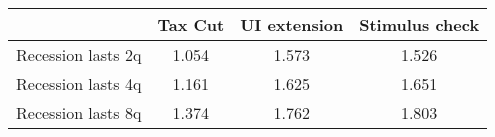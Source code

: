 \begin{tabular}{@{}lccc@{}} 
\toprule 
& Tax Cut    & UI extension    & Stimulus check    \\  \midrule 
Recession lasts 2q &1.054  & 1.573  & 1.526     \\ 
Recession lasts 4q &1.161  & 1.625  & 1.651     \\ 
Recession lasts 8q &1.374  & 1.762  & 1.803     \\ 
\end{tabular}  
